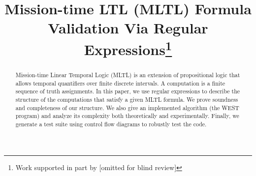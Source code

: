 \documentclass[runningheads]{llncs}
\begin{document}
%
\title{Mission-time LTL (MLTL) Formula Validation Via Regular Expressions\thanks{Work supported in part by [omitted for blind review]}}
%
%
%
%
%
\maketitle              %
%





\begin{abstract}
        \noindent Mission-time Linear Temporal Logic (MLTL) is an extension of propositional logic that allows temporal quantifiers over finite discrete intervals. A computation is a finite sequence of truth assignments. In this paper, we use regular expressions to describe the structure of the computations that satisfy a given MLTL formula. We prove soundness and completeness of our structure. We also give an implemented algorithm (the WEST program) and analyze its complexity both theoretically and experimentally. Finally, we generate a test suite using control flow diagrams to robustly test the code.

\end{abstract}
\end{document}
